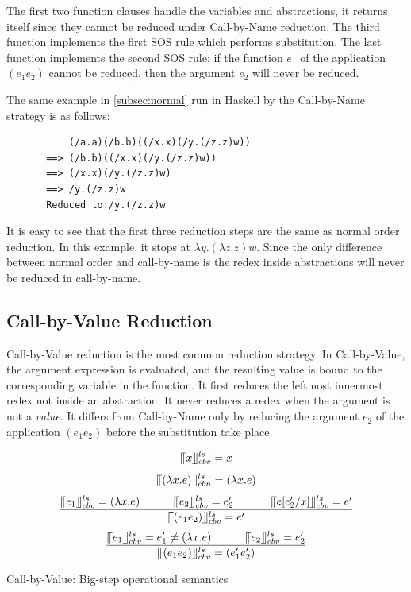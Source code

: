 \documentclass[a4paper,11pt,twoside]{report}
\begin{document}
The first two function clauses handle the variables and abstractions, it returns itself since they cannot be reduced under Call-by-Name reduction. The third function implements the first SOS rule which performs substitution. The last function implements the second SOS rule: if the function $e_1$ of the application $(e_1e_2)$ cannot be reduced, then the argument $e_2$ will never be reduced. 

The same example in \ref{subsec:normal} run in Haskell by the Call-by-Name strategy is as follows:

\begin{verbatim}
           (/a.a)(/b.b)((/x.x)(/y.(/z.z)w))
       ==> (/b.b)((/x.x)(/y.(/z.z)w))
       ==> (/x.x)(/y.(/z.z)w)
       ==> /y.(/z.z)w
       Reduced to:/y.(/z.z)w
\end{verbatim}

It is easy to see that the first three reduction steps are the same as normal order reduction. In this example, it stops at $\lambda y.(\lambda z.z)w$. Since the only difference between normal order and call-by-name is the redex inside abstractions will never be reduced in call-by-name. 


\subsection{Call-by-Value Reduction}{\label{subsec:cbv}}

Call-by-Value reduction is the most common reduction strategy. In Call-by-Value, the argument expression is evaluated, and the resulting value is bound to the corresponding variable in the function. It first reduces the leftmost innermost redex not inside an abstraction. It never reduces a redex when the argument is not a \textit{value}. It differs from Call-by-Name only by reducing the argument $e_2$ of the application $(e_1e_2)$ before the substitution take place. 


\begin{equation*}
\llceil x \rrfloor ^{ls} _{cbv} = x
\end{equation*}
\begin{equation*}
\llceil (\lambda x.e) \rrfloor ^{ls} _{cbn} = (\lambda x.e)
\end{equation*}
\begin{equation*}
\frac{\llceil e_1 \rrfloor ^{ls} _{cbv} = (\lambda x.e)\ \ \ \ \ \ \ \ \ \llceil e_2 \rrfloor ^{ls} _{cbv} = e'_2\ \ \ \ \ \ \ \ \ \ \llceil e[e'_2/x] \rrfloor ^{ls} _{cbv}  = e'}{\llceil (e_1e_2) \rrfloor ^{ls} _{cbv} = e'}
\end{equation*}
\begin{equation*}
\frac{\llceil e_1 \rrfloor ^{ls} _{cbv} = e'_1\neq (\lambda x.e)\ \ \ \ \ \ \ \ \ \llceil e_2 \rrfloor ^{ls} _{cbv} = e'_2}{\llceil (e_1e_2) \rrfloor ^{ls} _{cbv} = (e'_1e'_2)}
\end{equation*}
\begin{center}
Call-by-Value: Big-step operational semantics
\end{center}
\end{document}
